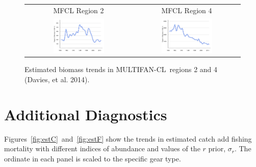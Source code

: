 \documentclass[12pt,letterpaper]{article}
\newcommand\MFCL{MULTIFAN-CL}
\begin{document}
\begin{figure}
\begin{center}
{\scriptsize \sffamily
\begin{tabular}{cc}
MFCL Region 2 & MFCL Region 4\\
\includegraphics[width=0.50\textwidth]{./annual_region_2_biomass.pdf} &
\includegraphics[width=0.50\textwidth]{./annual_region_4_biomass.pdf} \\
\end{tabular}
}
\end{center}
\caption{Estimated biomass trends in \MFCL\ regions 2 and 4 (Davies, et al. 2014).
\label{fig:mfclbiomass}
}
\end{figure}

\clearpage
\section{Additional Diagnostics}
\label{sec:diagnostics}

Figures~\ref{fig:estC}~and~\ref{fig:estF} show 
the trends in estimated catch add fishing mortality 
with different indices of abundance and values of the $r$
prior, $\sigma_r$.
The ordinate in each panel is scaled to the specific gear type.
\end{document}
